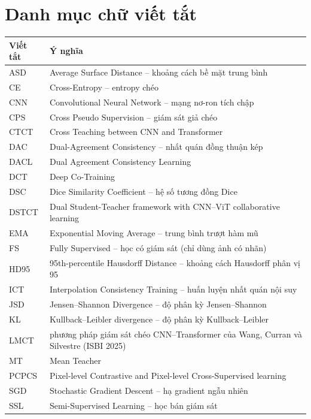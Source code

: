 \documentclass[12pt,a4paper,oneside]{report}
\begin{document}
\chapter*{Danh mục chữ viết tắt}
\begin{center}
\small
\begin{tabularx}{\textwidth}{l X}
\toprule
Viết tắt & Ý nghĩa \\
\midrule
ASD    & Average Surface Distance -- khoảng cách bề mặt trung bình \\
CE     & Cross-Entropy -- entropy chéo \\
CNN    & Convolutional Neural Network -- mạng nơ-ron tích chập \\
CPS    & Cross Pseudo Supervision -- giám sát giả chéo \\
CTCT   & Cross Teaching between CNN and Transformer \\
DAC    & Dual-Agreement Consistency -- nhất quán đồng thuận kép \\
DACL   & Dual Agreement Consistency Learning \\
DCT    & Deep Co-Training \\
DSC    & Dice Similarity Coefficient -- hệ số tương đồng Dice \\
DSTCT  & Dual Student-Teacher framework with CNN--ViT collaborative learning \\
EMA    & Exponential Moving Average -- trung bình trượt hàm mũ \\
FS     & Fully Supervised -- học có giám sát (chỉ dùng ảnh có nhãn) \\
HD95   & 95th-percentile Hausdorff Distance -- khoảng cách Hausdorff phân vị 95 \\
ICT    & Interpolation Consistency Training -- huấn luyện nhất quán nội suy \\
JSD    & Jensen--Shannon Divergence -- độ phân kỳ Jensen--Shannon \\
KL     & Kullback--Leibler divergence -- độ phân kỳ Kullback--Leibler \\
LMCT   & phương pháp giám sát chéo CNN--Transformer của Wang, Curran và Silvestre (ISBI 2025) \\
MT     & Mean Teacher \\
PCPCS  & Pixel-level Contrastive and Pixel-level Cross-Supervised learning \\
SGD    & Stochastic Gradient Descent -- hạ gradient ngẫu nhiên \\
SSL    & Semi-Supervised Learning -- học bán giám sát \\
\bottomrule
\end{tabularx}
\end{center}

\clearpage
{}










\appendix

\end{document}
